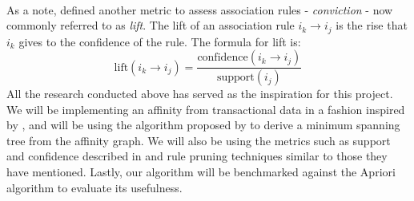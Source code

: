 \\As a note,  defined another metric to assess association rules - \textit{conviction} - now commonly referred to as \textit{lift}. The lift of an association rule $i_k \rightarrow i_j$ is the rise that $i_k$ gives to the confidence of the rule. The formula for lift is:
\[
\text{lift}(i_k \rightarrow i_j) = \frac{\text{confidence}(i_k \rightarrow i_j)}{\text{support}(i_j)}
\] 
All the research conducted above has served as the inspiration for this project. We will be implementing an affinity from transactional data in a fashion inspired by , and will be using the algorithm proposed by  to derive a minimum spanning tree from the affinity graph. We will also be using the metrics such as support and confidence described in  and rule pruning techniques similar to those they have mentioned. Lastly, our algorithm will be benchmarked against the Apriori algorithm  to evaluate its usefulness.
